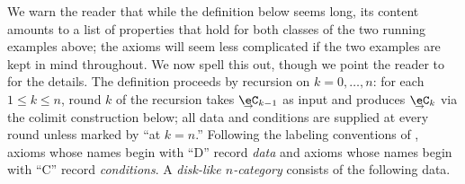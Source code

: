 \documentclass[12pt,reqno]{amsart}
\newcommand{\C}{\eC}
\newcommand{\defn}[1]{\emph{#1}}
\newcommand{\undCtemp}{\bgroup\smash[b]{\text{$\underset{\smash{\raisebox{.225em}{$\scriptstyle\kern.05ex\rightarrow$}}}{\smash{\C}}$}}\egroup}
\newcommand{\undC}{\vphantom{\C}{\undCtemp}}
\begin{document}
We warn the reader that while the definition below seems long, its content amounts to a list of properties that hold for both classes of the two running examples above; the axioms will seem less complicated if the two examples are kept in mind throughout. We now spell this out, though we point the reader to \cite[\S6.1--3]{MW12} for the details. The definition proceeds by recursion on $k=0,\ldots,n$: for each $1\leq k\leq n$, round $k$ of the recursion takes $\undC_{k-1}$ as input and produces $\undC_k$ via the colimit construction below; all data and conditions are supplied at every round unless marked by ``at $k=n$.''
\label{sec:full-axiomatic-definition}
Following the labeling conventions of \cite{DR18}, axioms whose names begin with ``D'' record \emph{data} and axioms whose names begin with ``C'' record \emph{conditions}. A \defn{disk-like $n$-category} consists of the following data.
\end{document}
